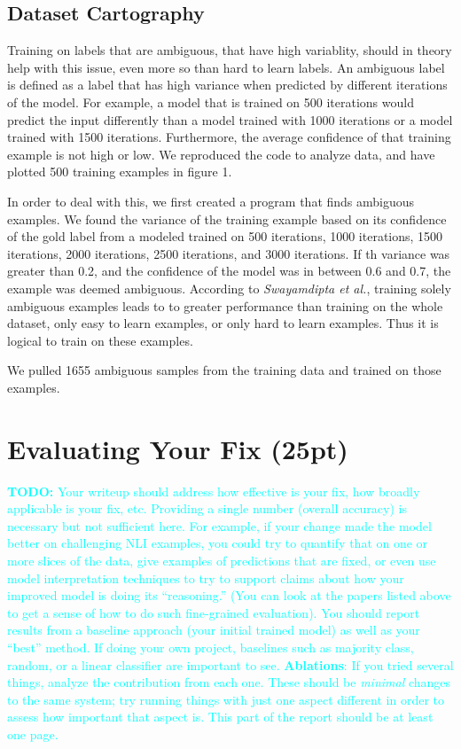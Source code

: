 \documentclass[twocolumn]{article}
\newcommand{\todo}[1]{\textcolor{cyan}{\textbf{TODO:} #1}}
\begin{document}
\subsection{Dataset Cartography}

Training on labels that are ambiguous, that have high variablity, should in
theory help with this issue, even more so than hard to learn labels. An
ambiguous label is defined as a label that has high variance when predicted by
different iterations of the model. For example, a model that is trained on 500
iterations would predict the input differently than a model trained with 1000
iterations or a model trained with 1500 iterations. Furthermore, the average
confidence of that training example is not high or low.
\cite{swayamdipta2020dataset} We reproduced the code to analyze data, and have
plotted 500 training examples in figure 1. 

In order to deal with this, we first created a program that finds ambiguous
examples. We found the variance of the training example based on its confidence
of the gold label from a modeled trained on 500 iterations, 1000 iterations,
1500 iterations, 2000 iterations, 2500 iterations, and 3000 iterations. If th
variance was greater than 0.2, and the confidence of the model was in between
0.6 and 0.7, the example was deemed ambiguous. According to \textit{Swayamdipta
et al.}, training solely ambiguous examples leads to to greater performance
than training on the whole dataset, only easy to learn examples, or only hard to
learn examples. Thus it is logical to train on these examples. 

We pulled 1655 ambiguous samples from the training data and trained on those examples.

\section{Evaluating Your Fix (25pt)}


\todo{
Your writeup should address how effective is your fix, how broadly applicable
is your fix, etc. Providing a single number (overall accuracy) is necessary but
not sufficient here. For example, if your change made the model better on
challenging NLI examples, you could try to quantify that on one or more slices
of the data, give examples of predictions that are fixed, or even use model
interpretation techniques to try to support claims about how your improved
model is doing its ``reasoning.'' (You can look at the papers listed above to
get a sense of how to do such fine-grained evaluation).  You should report
results from a baseline approach (your initial trained model) as well as your
``best'' method. If doing your own project, baselines such as majority class,
random, or a linear classifier are important to see. \textbf{Ablations}: If you
tried several things, analyze the contribution from each one. These should be
\emph{minimal} changes to the same system; try running things with just one
aspect different in order to assess how important that aspect is. This part of
the report should be at least one page.}
\end{document}
